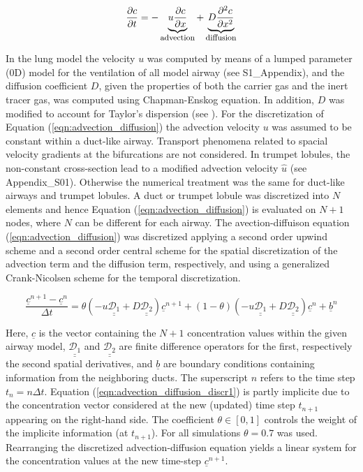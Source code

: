 \begin{equation} \label{eqn:advection_diffusion}
\frac{\partial c}{\partial t} = -\underbrace{u\frac{\partial c}{\partial x}}_{\text{\footnotesize{advection}}} + \underbrace{D\frac{\partial^2 c}{\partial x^2}}_{\text{\footnotesize{diffusion}}}
\end{equation}

In the lung model the velocity $u$ was computed by means of a lumped parameter (0D) model for the ventilation of all model airway (see S1\_Appendix), and the diffusion coefficient $D$, given the properties of both the carrier gas and the inert tracer gas, was computed using Chapman-Enskog equation.
In addition, $D$ was modified to account for Taylor's dispersion (see \cite{Cussler2009}).
For the discretization of Equation (\ref{eqn:advection_diffusion}) the advection velocity $u$ was assumed to be constant within a duct-like airway.
Transport phenomena related to spacial velocity gradients at the bifurcations are not considered.
In trumpet lobules, the non-constant cross-section lead to a modified advection velocity $\hat u$ (see Appendix\_S01).
Otherwise the numerical treatment was the same for duct-like airways and trumpet lobules.
A duct or trumpet lobule was discretized into $N$ elements and hence Equation (\ref{eqn:advection_diffusion}) is evaluated on $N+1$ nodes, where $N$ can be different for each airway.
The avection-diffuison equation (\ref{eqn:advection_diffusion}) was discretized applying a second order upwind scheme and a second order central scheme for the spatial discretization of the advection term and the diffusion term, respectively, and using a generalized Crank-Nicolsen scheme for the temporal discretization.

\begin{equation} \label{eqn:advection_diffusion_discr1}
\frac{\underline{c}^{n+1} - \underline{c}^{n}}{\Delta t} = \theta(-u\underline{\underline{\mathcal{D}_1}} + D \underline{\underline{\mathcal{D}_2}})\underline{c}^{n+1} + (1 - \theta)(-u\underline{\underline{\mathcal{D}_1}} + D \underline{\underline{\mathcal{D}_2}})\underline{c}^{n} + \underline{b}^n
\end{equation}

Here, $\underline{c}$ is the vector containing the $N+1$ concentration values within the given airway model, $\underline{\underline{\mathcal{D}_1}}$ and $\underline{\underline{\mathcal{D}_2}}$ are finite difference operators for the first, respectively the second spatial derivatives, and $\underline{b}$ are boundary conditions containing information from the neighboring ducts.
The superscript $n$ refers to the time step $t_n = n \Delta t$.
Equation (\ref{eqn:advection_diffusion_discr1}) is partly implicite due to the concentration vector considered at the new (updated) time step  $t_{n+1}$ appearing on the right-hand side.
The coefficient $\theta \in [0, 1]$ controls the weight of the implicite information (at $t_{n+1}$).
For all simulations $\theta = 0.7$ was used.
Rearranging the discretized advection-diffusion equation yields a linear system for the concentration values at the new time-step $\underline{c}^{n+1}$.

